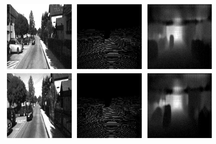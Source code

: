 \begin{figure}[t!]
\centering
\includegraphics[width=0.32\textwidth]{images/gray_image1.png}
\includegraphics[width=0.32\textwidth]{images/height_image1.png}
\includegraphics[width=0.32\textwidth]{images/depth_image1.png}
\includegraphics[width=0.32\textwidth]{images/gray_image2.png}
\includegraphics[width=0.32\textwidth]{images/height_image2.png}
\includegraphics[width=0.32\textwidth]{images/depth_image2.png}

\end{figure}
